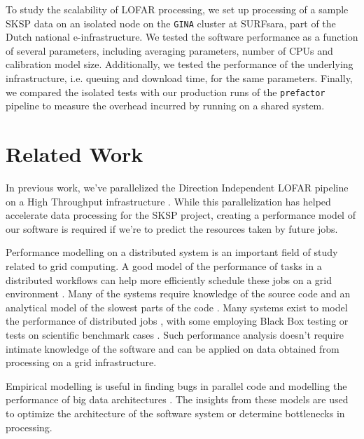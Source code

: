 \documentclass[preprint,5p]{elsarticle}
\begin{document}
To study the scalability of LOFAR processing, we set up processing of a sample SKSP data on an isolated node on the \texttt{GINA} cluster at SURFsara, part of the Dutch national e-infrastructure. We tested the software performance as a function of several parameters, including averaging parameters, number of CPUs and calibration model size. Additionally, we tested the performance of the underlying infrastructure, i.e. queuing  and download time, for the same parameters. Finally, we compared the isolated tests with our production runs of the \texttt{prefactor} pipeline to measure the overhead incurred by running on a shared system. 


\section{Related Work}\label{sec:related}
In previous work, we've parallelized the Direction Independent LOFAR pipeline on a High Throughput infrastructure \citep{mechev17}. While this parallelization has helped accelerate data processing for the SKSP project, creating a performance model of our software is required if we're to predict the resources taken by future jobs. 

Performance modelling on a distributed system is an important field of study related to grid computing. A good model of the performance of tasks in a distributed workflows can help more efficiently schedule these jobs on a grid environment \citep{grid_perform_model}. Many of the systems require knowledge of the source code and an analytical model of the slowest parts of the code \citep{semi_analytical_model}. Many systems exist to model the performance of distributed jobs \citep{barnes2008regression, semi_analytical_model,performance_prediction,Witt2018PredictivePM}, with some employing Black Box testing \citep{cross_platform_black_box, mapreduce_analysis} or tests on scientific benchmark cases \citep{synthetic_memory_prediction}. Such performance analysis doesn't require intimate knowledge of the software and can be applied on data obtained from processing on a grid infrastructure. 

Empirical modelling is useful in finding bugs in parallel code \citep{scalability_bugs} and modelling the performance of big data architectures \citep{mean_field_modeling}. The insights from these models are used to optimize the architecture of the software system or determine bottlenecks in processing. 


\end{document}
